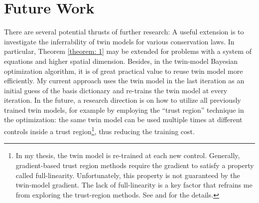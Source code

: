\section{Future Work}
There are several potential thrusts of further research: 
A useful extension is to investigate the
inferrability of twin models for various conservation laws. In particular,
Theorem \ref{theorem: 1} may be extended for problems with a
system of equations and higher spatial dimension. 
Besides, in the twin-model Bayesian optimization algorithm, 
it is of great practical value to reuse twin model more efficiently.
My current approach uses the twin model in the last iteration as an initial guess
of the basis dictionary
and re-trains the twin model at every iteration. In the future, a
research direction is on how to utilize all previously trained twin models,
for example by employing
the ``trust region'' technique in the optimization: the same twin model can be used multiple times
at different controls inside a trust region\footnote{In my thesis,
the twin model is re-trained at each new control. Generally, gradient-based
trust region methods require the gradient to satisfy a property called full-linearity.
Unfortunately, this property is not guaranteed 
by the twin-model gradient. The lack of full-linearity is a key factor
that refrains me from exploring the trust-region methods. See 
\cite{trustregionconn} and \cite{trustregionwild} for the details.}, thus reducing
the training cost.


